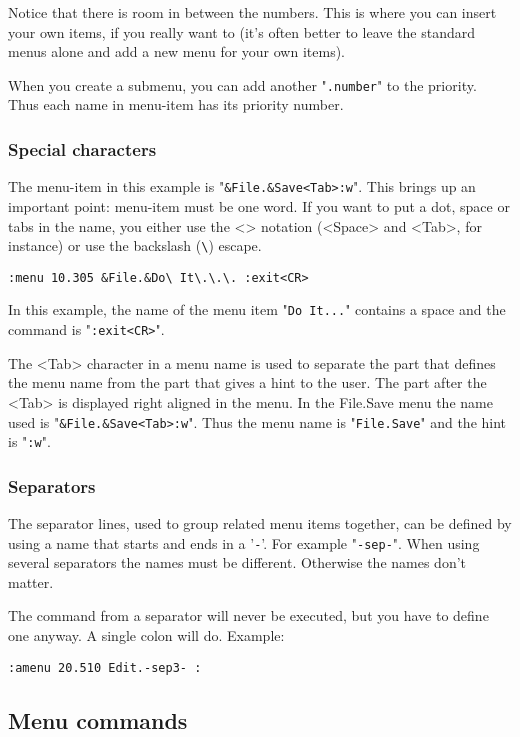 Notice that there is room in between the numbers.
This is where you can insert your own items, if you really want to (it's often better to leave the standard menus alone and add a new menu for your own items).

When you create a submenu, you can add another "\verb!.number!" to the priority.
Thus each name in {menu-item} has its priority number.

\subsubsection{Special characters}
The {menu-item} in this example is "\verb!&File.&Save<Tab>:w!".
This brings up an important point: {menu-item} must be one word.
If you want to put a dot, space or tabs in the name, you either use the <> notation (<Space> and <Tab>, for instance) or use the backslash (\verb!\!) escape.

\begin{Verbatim}[samepage=true]
 :menu 10.305 &File.&Do\ It\.\.\. :exit<CR>
\end{Verbatim}

In this example, the name of the menu item "\verb!Do It...!" contains a space and the command is "\verb!:exit<CR>!".

The <Tab> character in a menu name is used to separate the part that defines the menu name from the part that gives a hint to the user.
The part after the <Tab> is displayed right aligned in the menu.
In the File.Save menu the name used is "\verb!&File.&Save<Tab>:w!".
Thus the menu name is "\verb!File.Save!" and the hint is "\verb!:w!".

\subsubsection{Separators}
The separator lines, used to group related menu items together, can be defined by using a name that starts and ends in a '\verb!-!'.
For example "\verb!-sep-!".
When using several separators the names must be different.
Otherwise the names don't matter.

The command from a separator will never be executed, but you have to define one anyway.
A single colon will do.
Example:

\begin{Verbatim}[samepage=true]
 :amenu 20.510 Edit.-sep3- :
\end{Verbatim}
\subsection{Menu commands}

